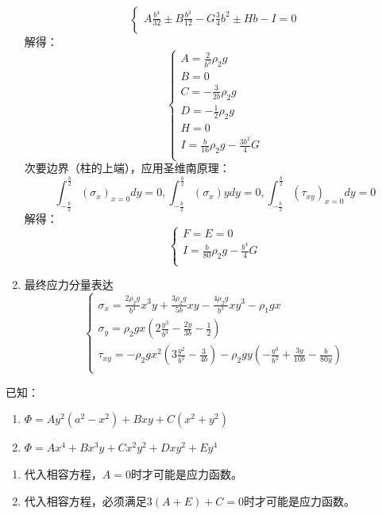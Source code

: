 \begin{remark}
\begin{enumerate}
\[\begin{cases}
	A\frac{b^4}{32}\pm B\frac{b^3}{12}-G\frac{3}{4}b^2\pm Hb-I=0\\
	\end{cases}\]
	解得：\[\begin{cases}
	A=\frac{2}{b^3}\rho _2g\\
	B=0\\
	C=-\frac{3}{2b}\rho _2g\\
	D=-\frac{1}{2}\rho _2g\\
	H=0\\
	I=\frac{b}{16}\rho _2g-\frac{3b^2}{4}G\\
	\end{cases}\]
	次要边界（柱的上端），应用圣维南原理：\[\int_{-\frac{b}{2}}^{\frac{b}{2}}{\left( \sigma _x \right) _{x=0}dy=0},\int_{-\frac{b}{2}}^{\frac{b}{2}}{\left( \sigma _x \right) ydy=0},\int_{-\frac{b}{2}}^{\frac{b}{2}}{\left( \tau _{xy} \right) _{x=0}dy}=0\]
	解得：\[\begin{cases}
	F=E=0\\
	I=\frac{b}{80}\rho _2g-\frac{b^4}{4}G\\
	\end{cases}\]
	\item 最终应力分量表达
	\[\begin{cases}
	\sigma _x=\frac{2\rho _2g}{b^3}x^3y+\frac{3\rho _2g}{5b}xy-\frac{4\rho _2g}{b^3}xy^3-\rho _1gx\\
	\sigma _y=\rho _2gx\left( 2\frac{y^3}{b^3}-\frac{2y}{3b}-\frac{1}{2} \right)\\
	\tau _{xy}=-\rho _2gx^2\left( 3\frac{y^2}{b^3}-\frac{3}{4b} \right) -\rho _2gy\left( -\frac{y^3}{b^3}+\frac{3y}{10b}-\frac{b}{80y} \right)\\
	\end{cases}\]
\end{enumerate}
\end{remark}
\begin{example}
	已知：
	\begin{enumerate}
		\item $\varPhi =Ay^2\left( a^2-x^2 \right) +Bxy+C\left( x^2+y^2 \right) $
		\item $\varPhi =Ax^4+Bx^3y+Cx^2y^2+Dxy^2+Ey^4$
	\end{enumerate}
\end{example}
\begin{remark}
	\quad
	\begin{enumerate}
		\item 代入相容方程，$A=0$时才可能是应力函数。
		\item 代入相容方程，必须满足$3\left( A+E \right) +C=0$时才可能是应力函数。
	\end{enumerate}
\end{remark}
